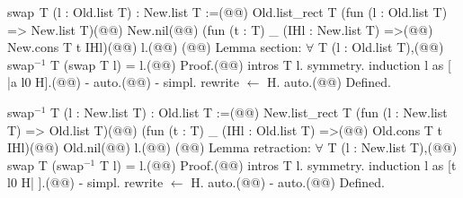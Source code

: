 swap$\phantom{^{2}}$T (l : Old.list T) : New.list T :=(@\vspace{-0.04cm}@)
  Old.list_rect T (fun (l : Old.list T) => New.list T)(@\vspace{-0.04cm}@)
    New.nil(@\vspace{-0.04cm}@)
    (fun (t : T) _ (IHl : New.list T) =>(@\vspace{-0.04cm}@)
      New.cons T t IHl)(@\vspace{-0.04cm}@)
    l.(@\vspace{-0.04cm}@)
(@\vspace{-0.04cm}@)
Lemma section: $\forall$ T (l : Old.list T),(@\vspace{-0.04cm}@)
  swap$^{-1}$ T (swap T l) = l.(@\vspace{-0.04cm}@)
Proof.(@\vspace{-0.04cm}@)
  intros T l. symmetry. induction l as [ |a l0 H].(@\vspace{-0.04cm}@)
  - auto.(@\vspace{-0.04cm}@)
  - simpl. rewrite $\leftarrow$ H. auto.(@\vspace{-0.04cm}@)
Defined.

swap$^{-1}$ T (l : New.list T) : Old.list T :=(@\vspace{-0.04cm}@)
  New.list_rect T (fun (l : New.list T) => Old.list T)(@\vspace{-0.04cm}@)
    (fun (t : T) _ (IHl : Old.list T) =>(@\vspace{-0.04cm}@)
      Old.cons T t IHl)(@\vspace{-0.04cm}@)
    Old.nil(@\vspace{-0.04cm}@)
    l.(@\vspace{-0.04cm}@)
(@\vspace{-0.04cm}@)
Lemma retraction: $\forall$ T (l : New.list T),(@\vspace{-0.04cm}@)
  swap T (swap$^{-1}$ T l) = l.(@\vspace{-0.04cm}@)
Proof.(@\vspace{-0.04cm}@)
  intros T l. symmetry. induction l as [t l0 H| ].(@\vspace{-0.04cm}@)
  - simpl. rewrite $\leftarrow$ H. auto.(@\vspace{-0.04cm}@)
  - auto.(@\vspace{-0.04cm}@)
Defined.
